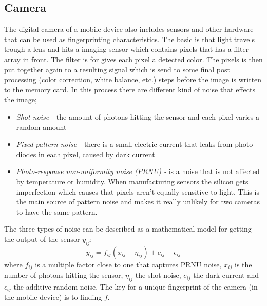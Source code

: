 \subsection{Camera}\label{sec:char:camera}
The digital camera of a mobile device also includes sensors and other hardware that can be used as fingerprinting characteristics. The basic is that light travels trough a lens and hits a imaging sensor which contains pixels that has a filter array in front. The filter is for gives each pixel a detected color. The pixels is then put together again to a resulting signal which is send to some final post processing (color correction, white balance, etc.) steps before the image is written to the memory card. In this process there are different kind of noise that effects the image;
\begin{itemize}
	\item[] \textit{Shot noise -} the amount of photons hitting the sensor and each pixel varies a random amount
	\item[] \textit{Fixed pattern noise - }there is a small electric current that leaks from photo-diodes in each pixel, caused by dark current
	\item[] \textit{Photo-response non-uniformity noise (PRNU) -} is a noise that is not affected by temperature or humidity. When manufacturing sensors the silicon gets imperfection which causes that pixels aren't equally sensitive to light. This is the main source of pattern noise and makes it really unlikely for two cameras to have the same pattern.
\end{itemize}
The three types of noise can be described as a mathematical model for getting the output of the sensor $y_{ij}$:
$$y_{ij}=f_{ij}(x_{ij}+\eta_{ij})+c_{ij}+\epsilon_{ij}$$
where $f_{ij}$ is a multiple factor close to one that captures PRNU noise, $x_{ij}$ is the number of photons hitting the sensor, $\eta_{ij}$ the shot noise, $c_{ij}$ the dark current and $\epsilon_{ij}$ the additive random noise. The key for a unique fingerprint of the camera (in the mobile device) is to finding $f$.
\cite[]{sensor:camera:DCIdent}


